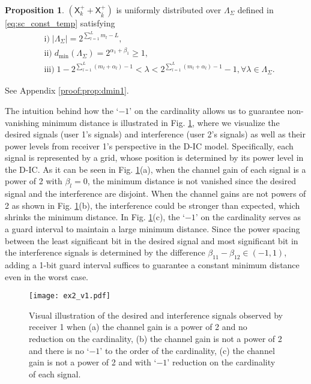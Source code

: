 \documentclass[12pt, draftclsnofoot, onecolumn]{IEEEtran}
\newcommand{\msf}[1]{\mathsf{#1}}
\theoremstyle{definition}
\newtheorem{proposition}{Proposition}
\begin{document}
\begin{proposition}\label{prop:dmin1}
$(\msf{X}^{+}_k+\msf{X}^{+}_{\bar{k}})$ is uniformly distributed over $\Lambda_{\Sigma}$ defined in \eqref{eq:sc_const_temp} satisfying
\begin{align}
&\text{i)}\; |\Lambda_{\Sigma}| = 2^{\sum_{l=1}^Lm_l-L}, \nonumber \\
&\text{ii)}\; d_{\min}(\Lambda_{\Sigma}) = 2^{\alpha_1+\beta_1}\geq 1, \nonumber \\
&\text{iii)}\; 1-2^{\sum_{l=1}^L(m_l+\alpha_l)-1}< \lambda < 2^{\sum_{l=1}^L(m_l+\alpha_l)-1}-1 ,\forall\lambda \in \Lambda_{\Sigma}. \nonumber
\end{align}
\end{proposition}
\begin{IEEEproof}
See Appendix \ref{proof:prop:dmin1}.
\end{IEEEproof}

The intuition behind how the `$-1$' on the cardinality allows us to guarantee non-vanishing minimum distance is illustrated in Fig. \ref{fig:type_I_rx}, where we visualize the desired signals (user 1's signals) and interference (user 2's signals) as well as their power levels from receiver 1's perspective in the D-IC model. Specifically, each signal is represented by a grid, whose position is determined by its power level in the D-IC. As it can be seen in Fig. \ref{fig:type_I_rx}(a), when the channel gain of each signal is a power of 2 with $\beta_l=0$, the minimum distance is not vanished since the desired signal and the interference are disjoint. When the channel gains are not powers of 2 as shown in Fig. \ref{fig:type_I_rx}(b), the interference could be stronger than expected, which shrinks the minimum distance. In Fig. \ref{fig:type_I_rx}(c), the `$-1$' on the cardinality serves as a guard interval to maintain a large minimum distance. Since the power spacing between the least significant bit in the desired signal and most significant bit in the interference signals is determined by the difference $\beta_{11}-\beta_{12} \in (-1,1)$, adding a 1-bit guard interval suffices to guarantee a constant minimum distance even in the worst case.
\begin{figure}[t!]
	\centering
\texttt{[image: ex2\_v1.pdf]}
\caption{Visual illustration of the desired and interference signals observed by receiver 1 when (a) the channel gain is a power of 2 and no reduction on the cardinality, (b) the channel gain is not a power of 2 and there is no `$-1$' to the order of the cardinality, (c) the channel gain is not a power of 2 and with `$-1$' reduction on the cardinality of each signal.}
\label{fig:type_I_rx}
\end{figure}
\end{document}
